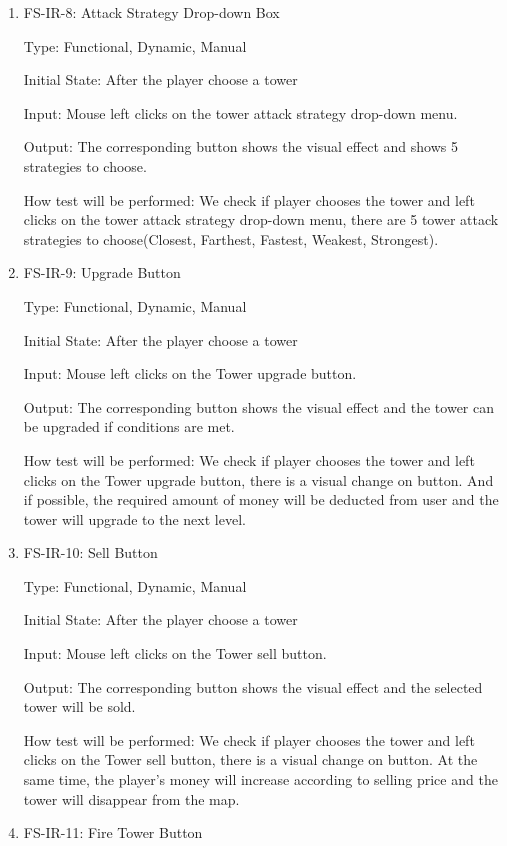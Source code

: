 \documentclass[12pt]{article}
\begin{document}
\begin{enumerate}
	\item{FS-IR-8: Attack Strategy Drop-down Box}
					
	Type: Functional, Dynamic, Manual
					
	Initial State: After the player choose a tower
					
	Input: Mouse left clicks on the tower attack strategy drop-down menu.
					
	Output: The corresponding button shows the visual effect and shows 5 strategies to choose.
					
	How test will be performed: We check if player chooses the tower and left clicks on the tower attack strategy drop-down menu, there are 5 tower attack strategies to choose(Closest, Farthest, Fastest, Weakest, Strongest).
	
	\item{FS-IR-9: Upgrade Button}
					
	Type: Functional, Dynamic, Manual
					
	Initial State: After the player choose a tower
					
	Input: Mouse left clicks on the Tower upgrade button.
					
	Output: The corresponding button shows the visual effect and the tower can be upgraded if conditions are met.
					
	How test will be performed: We check if player chooses the tower and left clicks on the Tower upgrade button, there is a visual change on button. And if possible, the required amount of money will be deducted from user and the tower will upgrade to the next level.
	
	\item{FS-IR-10: Sell Button}
					
	Type: Functional, Dynamic, Manual
					
	Initial State: After the player choose a tower
					
	Input: Mouse left clicks on the Tower sell button.
					
	Output: The corresponding button shows the visual effect and the selected tower will be sold.
					
	How test will be performed: We check if player chooses the tower and left clicks on the Tower sell button, there is a visual change on button. At the same time, the player's money will increase according to selling price and the tower will disappear from the map.
	
	\item{FS-IR-11: Fire Tower Button}
					

\end{enumerate}
\end{document}
